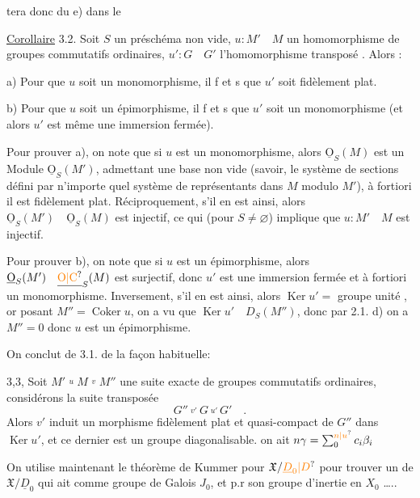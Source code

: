tera donc du e) dans le

\uline{Corollaire} 3.2. Soit $S$ un préschéma non vide, $u:M'\quad M$ un homomorphisme de groupes commutatifs ordinaires, $u':G\quad G'$ l'homomorphisme transposé . Alors :

a) Pour que $u$ soit un monomorphisme, il f et s que $u'$ soit fidèlement plat.

b) Pour que $u$ soit un épimorphisme, il f et s que $u'$ soit un monomorphisme (et alors $u'$ est même une immersion fermée).

Pour prouver a), on note que si $u$ est un monomorphisme, alors
$\underline{\mathrm O}_S(M)$ est un Module   $\underline{\mathrm O}_S(M')$, 
admettant une base non vide (savoir, le système de sections défini par
n'importe quel système de représentants dans $M$ modulo $M'$), à fortiori
il est fidèlement plat. Réciproquement, s'il en est ainsi, alors $\underline{\mathrm O}_S(M')\quad
\underline{\mathrm O}_S(M)$ est injectif, ce qui (pour $S\ne\varnothing$) implique que $u:M'\quad M$ est
injectif.

Pour prouver b), on note que si $u$ est un épimorphisme, alors
$\underline{\mathrm O}_S(M')\quad\underline{\unsure{\mathrm O|\mathrm C}}_S(M)$ est surjectif, donc $u'$ est une immersion fermée et à
fortiori un monomorphisme. Inversement, s'il en est ainsi, alors $\operatorname{Ker} u'={}$ groupe unité , or  posant $M''=\operatorname{Coker}u$, on a vu que
$\operatorname{Ker}u'\quad D_S(M'')$, donc par 2.1. d) on a $M''=0$ donc $u$ est un épimorphisme.

On conclut de 3.1. de la façon habituelle:

\uline{} 3,3, Soit $M'\overset{u}{\quad} M\overset{v}{\quad} M''$ une suite exacte de groupes
commutatifs ordinaires, considérons la suite transposée
\[
G''\overset{v'}{\quad} G\overset{u'}{\quad}G'\quad .
\]
Alors $v'$ induit un morphisme fidèlement plat et quasi-compact de $G''$
dans $\operatorname{Ker}u'$, et ce dernier est un groupe diagonalisable.
on ait $n\gamma=\sum_{0}^{\unsure{n|u}} c_i\beta_i$

On utilise maintenant le théorème de Kummer pour $\mathfrak X/\unsure{\underline D_0|D}$ pour trouver
un  de $\mathfrak X/\underline D_0$ qui ait comme
groupe  de Galois $J_0$, et p.r son
groupe d'inertie en $X_0$ \ldots..

